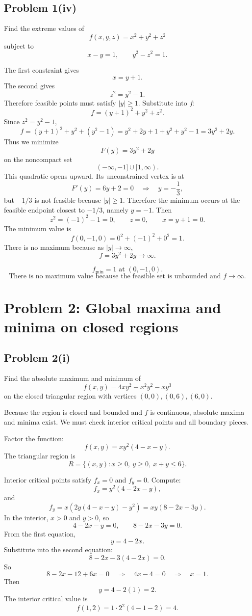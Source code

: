 \documentclass[11pt,a4paper]{article}
\begin{document}
\subsection{Problem 1(iv)}
Find the extreme values of
\[
 f(x,y,z)=x^2+y^2+z^2
\]
subject to
\[
 x-y=1,
\qquad y^2-z^2=1.
\]

The first constraint gives
\[
 x=y+1.
\]
The second gives
\[
 z^2=y^2-1.
\]
Therefore feasible points must satisfy \(|y|\ge1\).  Substitute into \(f\):
\[
 f=(y+1)^2+y^2+z^2.
\]
Since \(z^2=y^2-1\),
\[
 f=(y+1)^2+y^2+(y^2-1)
 =y^2+2y+1+y^2+y^2-1
 =3y^2+2y.
\]
Thus we minimize
\[
 F(y)=3y^2+2y
\]
on the noncompact set
\[
 (-\infty,-1]\cup[1,\infty).
\]
This quadratic opens upward.  Its unconstrained vertex is at
\[
 F'(y)=6y+2=0
\quad\Longrightarrow\quad y=-\frac13,
\]
but \(-1/3\) is not feasible because \(|y|\ge1\).  Therefore the minimum occurs at the feasible endpoint closest to \(-1/3\), namely \(y=-1\).  Then
\[
 z^2=(-1)^2-1=0,
\qquad z=0,
\qquad x=y+1=0.
\]
The minimum value is
\[
 f(0,-1,0)=0^2+(-1)^2+0^2=1.
\]
There is no maximum because as \(|y|\to\infty\),
\[
 f=3y^2+2y\to\infty.
\]

\begin{answerbox}
\[
\boxed{f_{\min}=1\text{ at }(0,-1,0).}
\]
\[
\boxed{\text{There is no maximum value because the feasible set is unbounded and }f\to\infty.}
\]
\end{answerbox}

\section{Problem 2: Global maxima and minima on closed regions}

\subsection{Problem 2(i)}
Find the absolute maximum and minimum of
\[
 f(x,y)=4xy^2-x^2y^2-xy^3
\]
on the closed triangular region with vertices \((0,0),(0,6),(6,0)\).

\begin{methodbox}
Because the region is closed and bounded and \(f\) is continuous, absolute maxima and minima exist.  We must check interior critical points and all boundary pieces.
\end{methodbox}

Factor the function:
\[
 f(x,y)=xy^2(4-x-y).
\]
The triangular region is
\[
 R=\{(x,y):x\ge0,
\ y\ge0,
\ x+y\le6\}.
\]

Interior critical points satisfy \(f_x=0\) and \(f_y=0\).  Compute:
\[
 f_x=y^2(4-2x-y),
\]
and
\[
 f_y=x\left(2y(4-x-y)-y^2\right)
 =xy(8-2x-3y).
\]
In the interior, \(x>0\) and \(y>0\), so
\[
 4-2x-y=0,
\qquad 8-2x-3y=0.
\]
From the first equation,
\[
 y=4-2x.
\]
Substitute into the second equation:
\[
 8-2x-3(4-2x)=0.
\]
So
\[
 8-2x-12+6x=0
\quad\Longrightarrow\quad
4x-4=0
\quad\Longrightarrow\quad
x=1.
\]
Then
\[
 y=4-2(1)=2.
\]
The interior critical value is
\[
 f(1,2)=1\cdot 2^2(4-1-2)=4.
\]
\end{document}
